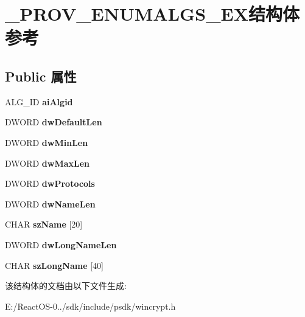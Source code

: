 \hypertarget{struct___p_r_o_v___e_n_u_m_a_l_g_s___e_x}{}\section{\+\_\+\+P\+R\+O\+V\+\_\+\+E\+N\+U\+M\+A\+L\+G\+S\+\_\+\+E\+X结构体 参考}
\label{struct___p_r_o_v___e_n_u_m_a_l_g_s___e_x}
\subsection*{Public 属性}
\begin{DoxyCompactItemize}
\item 
\mbox{\label{struct___p_r_o_v___e_n_u_m_a_l_g_s___e_x_aae7bad293470026eb81b2861f83f1325}} 
A\+L\+G\+\_\+\+ID {\bfseries ai\+Algid}
\item 
\mbox{\label{struct___p_r_o_v___e_n_u_m_a_l_g_s___e_x_a633556c339cb3c1cc90b27593641064c}} 
D\+W\+O\+RD {\bfseries dw\+Default\+Len}
\item 
\mbox{\label{struct___p_r_o_v___e_n_u_m_a_l_g_s___e_x_a817f31693ebea7506bca55c8165bf04f}} 
D\+W\+O\+RD {\bfseries dw\+Min\+Len}
\item 
\mbox{\label{struct___p_r_o_v___e_n_u_m_a_l_g_s___e_x_aac080559824847fc23c63529d70b01fd}} 
D\+W\+O\+RD {\bfseries dw\+Max\+Len}
\item 
\mbox{\label{struct___p_r_o_v___e_n_u_m_a_l_g_s___e_x_a9197278c5dd374d39e4af092a446b9cc}} 
D\+W\+O\+RD {\bfseries dw\+Protocols}
\item 
\mbox{\label{struct___p_r_o_v___e_n_u_m_a_l_g_s___e_x_acebf46dfacf46bce81dd46e951db695f}} 
D\+W\+O\+RD {\bfseries dw\+Name\+Len}
\item 
\mbox{\label{struct___p_r_o_v___e_n_u_m_a_l_g_s___e_x_a14c1098c5e8f7cd43e114341d88b82f2}} 
C\+H\+AR {\bfseries sz\+Name} \mbox{[}20\mbox{]}
\item 
\mbox{\label{struct___p_r_o_v___e_n_u_m_a_l_g_s___e_x_ad9a5b103f40a2797537c431a2cd0d167}} 
D\+W\+O\+RD {\bfseries dw\+Long\+Name\+Len}
\item 
\mbox{\label{struct___p_r_o_v___e_n_u_m_a_l_g_s___e_x_abba3c19186ea4da1d2246d35edcf3194}} 
C\+H\+AR {\bfseries sz\+Long\+Name} \mbox{[}40\mbox{]}
\end{DoxyCompactItemize}


该结构体的文档由以下文件生成\+:\begin{DoxyCompactItemize}
\item 
E\+:/\+React\+O\+S-\/0../sdk/include/psdk/wincrypt.\+h\end{DoxyCompactItemize}
